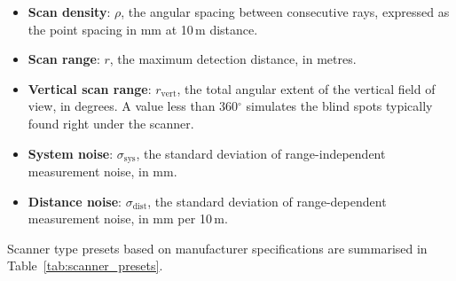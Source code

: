 \begin{itemize}
    \item \textbf{Scan density}: $\rho$, the angular spacing between consecutive rays, expressed as the point spacing in mm at 10\,m distance.
    \item \textbf{Scan range}: $r$, the maximum detection distance, in metres.
    \item \textbf{Vertical scan range}: $r_{\text{vert}}$, the total angular extent of the vertical field of view, in degrees. A value less than 360$^\circ$ simulates the blind spots typically found right under the scanner.
    \item \textbf{System noise}: $\sigma_{\text{sys}}$, the standard deviation of range-independent measurement noise, in mm.
    \item \textbf{Distance noise}: $\sigma_{\text{dist}}$, the standard deviation of range-dependent measurement noise, in mm per 10\,m.
\end{itemize}

Scanner type presets based on manufacturer specifications are summarised in Table~\ref{tab:scanner_presets}.

\begin{table}[h]
    \centering
    \caption[Virtual scanner presets]{Scanner type presets used in the virtual scanning framework, based on manufacturer specifications of real devices.}
    \label{tab:scanner_presets}
\end{table}

